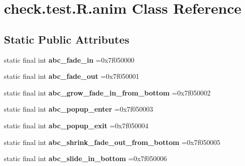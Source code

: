 \hypertarget{classcheck_1_1test_1_1_r_1_1anim}{}\section{check.\+test.\+R.\+anim Class Reference}
\label{classcheck_1_1test_1_1_r_1_1anim}
\subsection*{Static Public Attributes}
\begin{DoxyCompactItemize}
\item 
\hypertarget{classcheck_1_1test_1_1_r_1_1anim_a52cb48a16a2e6095cb9867b7e55f7f1d}{}static final int {\bfseries abc\+\_\+fade\+\_\+in} =0x7f050000\label{classcheck_1_1test_1_1_r_1_1anim_a52cb48a16a2e6095cb9867b7e55f7f1d}

\item 
\hypertarget{classcheck_1_1test_1_1_r_1_1anim_aaadd5e205bc8ac4d48f2a761ea2af38d}{}static final int {\bfseries abc\+\_\+fade\+\_\+out} =0x7f050001\label{classcheck_1_1test_1_1_r_1_1anim_aaadd5e205bc8ac4d48f2a761ea2af38d}

\item 
\hypertarget{classcheck_1_1test_1_1_r_1_1anim_ad999c2728e577607ddaa862689a78740}{}static final int {\bfseries abc\+\_\+grow\+\_\+fade\+\_\+in\+\_\+from\+\_\+bottom} =0x7f050002\label{classcheck_1_1test_1_1_r_1_1anim_ad999c2728e577607ddaa862689a78740}

\item 
\hypertarget{classcheck_1_1test_1_1_r_1_1anim_aa2b3ddaf84087d7d8b9b72bfc8b2b8d8}{}static final int {\bfseries abc\+\_\+popup\+\_\+enter} =0x7f050003\label{classcheck_1_1test_1_1_r_1_1anim_aa2b3ddaf84087d7d8b9b72bfc8b2b8d8}

\item 
\hypertarget{classcheck_1_1test_1_1_r_1_1anim_af7625bfb5f46466e085e17ce82acb216}{}static final int {\bfseries abc\+\_\+popup\+\_\+exit} =0x7f050004\label{classcheck_1_1test_1_1_r_1_1anim_af7625bfb5f46466e085e17ce82acb216}

\item 
\hypertarget{classcheck_1_1test_1_1_r_1_1anim_a8c5f67f52a5806e16443788ec0349d8b}{}static final int {\bfseries abc\+\_\+shrink\+\_\+fade\+\_\+out\+\_\+from\+\_\+bottom} =0x7f050005\label{classcheck_1_1test_1_1_r_1_1anim_a8c5f67f52a5806e16443788ec0349d8b}

\item 
\hypertarget{classcheck_1_1test_1_1_r_1_1anim_a1c53c74f56c8ef35944b86ca21d2a595}{}static final int {\bfseries abc\+\_\+slide\+\_\+in\+\_\+bottom} =0x7f050006\label{classcheck_1_1test_1_1_r_1_1anim_a1c53c74f56c8ef35944b86ca21d2a595}


\end{DoxyCompactItemize}
